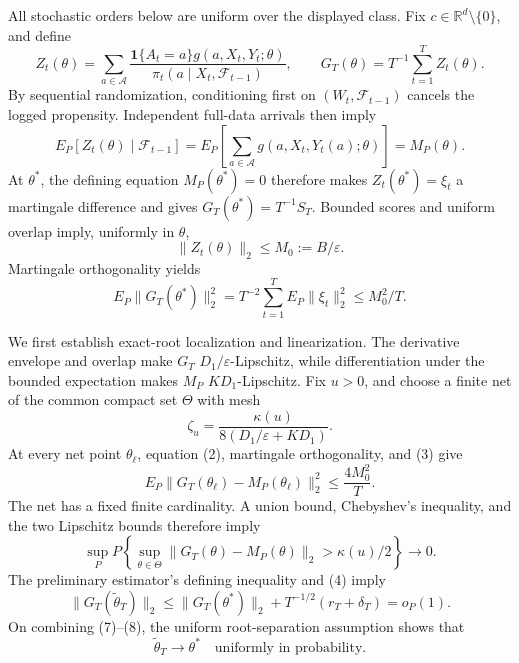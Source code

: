 All stochastic orders below are uniform over the displayed class.  Fix
\(c\in\mathbb R^d\setminus\{0\}\), and define
\[
 Z_t(\theta)=\sum_{a\in\mathcal A}
 \frac{\mathbf1\{A_t=a\}g(a,X_t,Y_t;\theta)}
 {\pi_t(a\mid X_t,\mathcal F_{t-1})},
 \qquad G_T(\theta)=T^{-1}\sum_{t=1}^TZ_t(\theta).
\tag{1}
\]
By sequential randomization, conditioning first on
\((W_t,\mathcal F_{t-1})\) cancels the logged propensity.  Independent
full-data arrivals then imply
\[
 E_P[Z_t(\theta)\mid\mathcal F_{t-1}]
 =E_P\!\left[\sum_{a\in\mathcal A}g(a,X_t,Y_t(a);\theta)\right]
 =M_P(\theta).
\tag{2}
\]
At \(\theta^*\), the defining equation \(M_P(\theta^*)=0\) therefore makes
\(Z_t(\theta^*)=\xi_t\) a martingale difference and gives
\(G_T(\theta^*)=T^{-1}S_T\).  Bounded scores and uniform overlap imply,
uniformly in \(\theta\),
\[
 \|Z_t(\theta)\|_2\le M_0:=B/\varepsilon.
\tag{3}
\]
Martingale orthogonality yields
\[
 E_P\|G_T(\theta^*)\|_2^2
 =T^{-2}\sum_{t=1}^TE_P\|\xi_t\|_2^2
 \le M_0^2/T.
\tag{4}
\]

We first establish exact-root localization and linearization.  The derivative
envelope and overlap make \(G_T\) \(D_1/\varepsilon\)-Lipschitz, while
differentiation under the bounded expectation makes \(M_P\)
\(KD_1\)-Lipschitz.  Fix \(u>0\), and choose a finite net of the common compact
set \(\Theta\) with mesh
\[
 \zeta_u=\frac{\kappa(u)}{8(D_1/\varepsilon+KD_1)}.
\tag{5}
\]
At every net point \(\theta_\ell\), equation (2), martingale orthogonality,
and (3) give
\[
 E_P\|G_T(\theta_\ell)-M_P(\theta_\ell)\|_2^2
 \le \frac{4M_0^2}{T}.
\tag{6}
\]
The net has a fixed finite cardinality.  A union bound, Chebyshev's inequality,
and the two Lipschitz bounds therefore imply
\[
 \sup_P P\!\left\{\sup_{\theta\in\Theta}
 \|G_T(\theta)-M_P(\theta)\|_2>\kappa(u)/2\right\}
 \longrightarrow0.
\tag{7}
\]
The preliminary estimator's defining inequality and (4) imply
\[
 \|G_T(\widetilde\theta_T)\|_2
 \le\|G_T(\theta^*)\|_2+T^{-1/2}(r_T+\delta_T)=o_P(1).
\tag{8}
\]
On combining (7)--(8), the uniform root-separation assumption shows that
\[
 \widetilde\theta_T\longrightarrow\theta^*
 \quad\text{uniformly in probability}.
\tag{9}
\]

